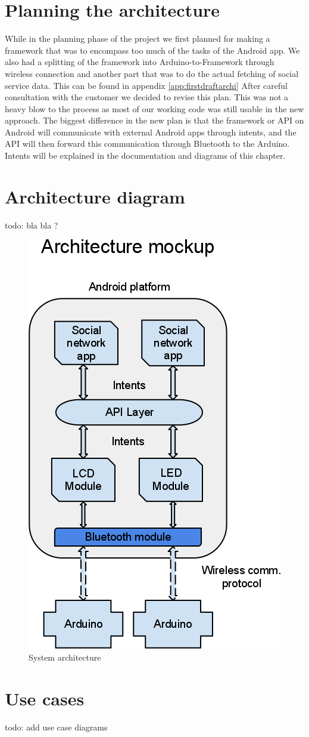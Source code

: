 \section{Planning the architecture}

While in the planning phase of the project we first planned for making a framework that was to
encompass too much of the tasks of the Android app. We also had a splitting of the framework into
Arduino-to-Framework through wireless connection and another part that was to do the actual fetching
of social service data. This can be found in appendix \ref{app:firstdraftarchi}
After careful consultation with the customer we decided to revise this plan. This was not a heavy blow
to the process as most of our working code was still usable in the new approach. The biggest difference
in the new plan is that the framework or API on Android will communicate with external Android apps through intents,
and the API will then forward this communication through Bluetooth to the Arduino. Intents will be explained
in the documentation and diagrams of this chapter.

\newpage
\section{Architecture diagram}
todo: bla bla ?
\begin{figure}[hb!]
\centering \includegraphics[scale=0.50]{img/architecture.png}
\caption{System architecture}
\label{fig:architecture}
\end{figure}

\section{Use cases}
todo: add use case diagrams